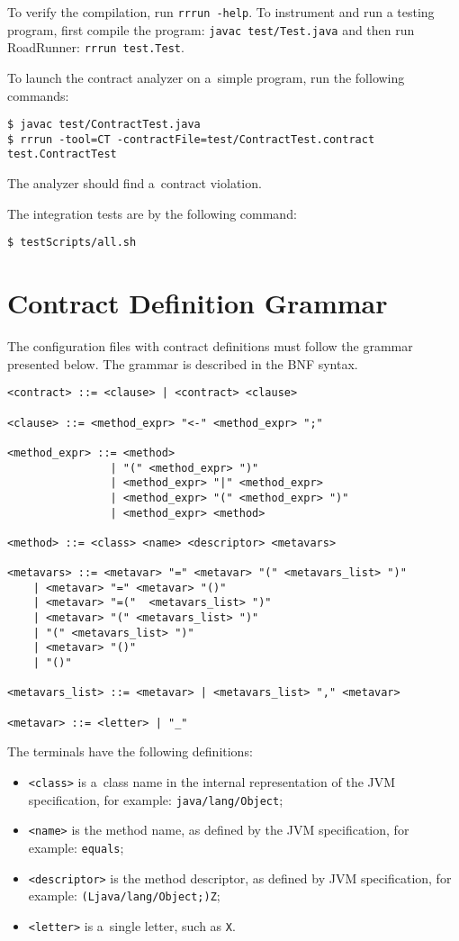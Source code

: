 To verify the compilation, run \texttt{rrrun -help}. To instrument and run a
testing program, first compile the program: \texttt{javac test/Test.java} and
then run RoadRunner: \texttt{rrrun test.Test}.

To launch the contract analyzer on a~simple program, run the following commands:
\begin{lstlisting}
$ javac test/ContractTest.java
$ rrrun -tool=CT -contractFile=test/ContractTest.contract test.ContractTest
\end{lstlisting}
The analyzer should find a~contract violation.

The integration tests are by the following command:
\begin{lstlisting}
$ testScripts/all.sh
\end{lstlisting}

\chapter{Contract Definition Grammar}
\label{appGrammar}

The configuration files with contract definitions must follow the grammar
presented below. The grammar is described in the BNF syntax.

\begin{lstlisting}
<contract> ::= <clause> | <contract> <clause>

<clause> ::= <method_expr> "<-" <method_expr> ";"

<method_expr> ::= <method>
                | "(" <method_expr> ")"
                | <method_expr> "|" <method_expr>
                | <method_expr> "(" <method_expr> ")"
                | <method_expr> <method>

<method> ::= <class> <name> <descriptor> <metavars>

<metavars> ::= <metavar> "=" <metavar> "(" <metavars_list> ")"
    | <metavar> "=" <metavar> "()" 
    | <metavar> "=("  <metavars_list> ")"
    | <metavar> "(" <metavars_list> ")"
    | "(" <metavars_list> ")"
    | <metavar> "()" 
    | "()"

<metavars_list> ::= <metavar> | <metavars_list> "," <metavar>

<metavar> ::= <letter> | "_"
\end{lstlisting}
The terminals have the following definitions:
\begin{itemize}
    \item \texttt{<class>} is a~class name in the internal representation of
        the JVM specification, for example: \texttt{java/lang/Object};
    \item \texttt{<name>} is the method name, as defined by the JVM
        specification, for example: \texttt{equals};
    \item \texttt{<descriptor>} is the method descriptor, as defined by JVM
        specification, for example: \texttt{(Ljava/lang/Object;)Z};
    \item \texttt{<letter>} is a~single letter, such as \texttt{X}.
\end{itemize}

